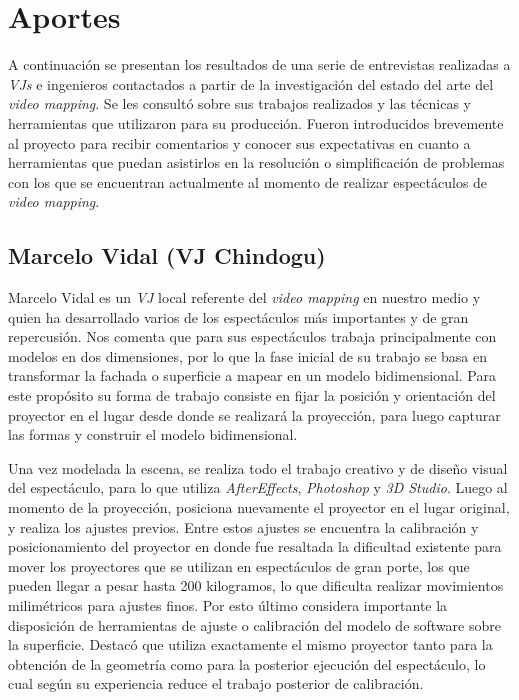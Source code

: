 ﻿\chapter{Aportes}
\label{chapter:aportes}
A continuación se presentan los resultados de una serie de entrevistas realizadas a \emph{VJs} e ingenieros contactados a partir de la investigación del estado del arte del \emph{video mapping}. Se les consultó sobre sus trabajos realizados y las técnicas y herramientas que utilizaron para su producción.
Fueron introducidos brevemente al proyecto para recibir comentarios y conocer sus expectativas en cuanto a herramientas que puedan asistirlos en la resolución o simplificación de problemas con los que se encuentran actualmente al momento de realizar espectáculos de \emph{video mapping}.

\section{Marcelo Vidal (VJ Chindogu)}
Marcelo Vidal\cite{Chindogu} es un \emph{VJ} local referente del \emph{video mapping} en nuestro medio y quien ha desarrollado varios de los espectáculos más importantes y de gran repercusión.
Nos comenta que para sus espectáculos trabaja principalmente con modelos en dos dimensiones, por lo que la fase inicial de su trabajo se basa en transformar la fachada o superficie a mapear en un modelo bidimensional.
Para este propósito su forma de trabajo consiste en fijar la posición y orientación del proyector en el lugar desde donde se realizará la proyección, para luego capturar las formas y construir el modelo bidimensional.

Una vez modelada la escena, se realiza todo el trabajo creativo y de diseño visual del espectáculo, para lo que utiliza \emph{AfterEffects}, \emph{Photoshop} y \emph{3D Studio}. Luego al momento de la proyección, posiciona nuevamente el proyector en el lugar original, y realiza los ajustes previos. Entre estos ajustes se encuentra la calibración y posicionamiento del proyector en donde fue resaltada la dificultad existente para mover los proyectores que se utilizan en espectáculos de gran porte, los que pueden llegar a pesar hasta 200 kilogramos, lo que dificulta realizar movimientos milimétricos para ajustes finos. Por esto último considera importante la disposición de herramientas de ajuste o calibración del modelo de software sobre la superficie. Destacó que utiliza exactamente el mismo proyector tanto para la obtención de la geometría como para la posterior ejecución del espectáculo, lo cual según su experiencia reduce el trabajo posterior de calibración.

